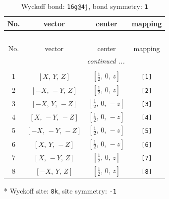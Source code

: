 \documentclass[fleqn,8pt]{jsarticle}
\begin{document}
\begin{longtable}{cccc}
\caption{Wyckoff bond: {\tt 16g@4j}, bond symmetry: {\tt 1}}
 \\
 \hline \hline
No. & vector & center & mapping \\ \hline \endfirsthead

\multicolumn{3}{l}{\tablename\ \thetable{}} \\
 \hline \hline
No. & vector & center & mapping \\ \hline \endhead

 \hline \hline
\multicolumn{3}{r}{\footnotesize\it continued ...} \\ \endfoot

 \hline \hline
\multicolumn{3}{r}{} \\ \endlastfoot

1 & $\left[ X,\, Y,\, Z \right]$ & $\left[ \frac{1}{2},\, 0,\, z \right]$ & {\tt [1]} \\ \hline
2 & $\left[ - X,\, - Y,\, Z \right]$ & $\left[ \frac{1}{2},\, 0,\, z \right]$ & {\tt [2]} \\ \hline
3 & $\left[ - X,\, Y,\, - Z \right]$ & $\left[ \frac{1}{2},\, 0,\, - z \right]$ & {\tt [3]} \\ \hline
4 & $\left[ X,\, - Y,\, - Z \right]$ & $\left[ \frac{1}{2},\, 0,\, - z \right]$ & {\tt [4]} \\ \hline
5 & $\left[ - X,\, - Y,\, - Z \right]$ & $\left[ \frac{1}{2},\, 0,\, - z \right]$ & {\tt [5]} \\ \hline
6 & $\left[ X,\, Y,\, - Z \right]$ & $\left[ \frac{1}{2},\, 0,\, - z \right]$ & {\tt [6]} \\ \hline
7 & $\left[ X,\, - Y,\, Z \right]$ & $\left[ \frac{1}{2},\, 0,\, z \right]$ & {\tt [7]} \\ \hline
8 & $\left[ - X,\, Y,\, Z \right]$ & $\left[ \frac{1}{2},\, 0,\, z \right]$ & {\tt [8]} \\
\end{longtable}
* Wyckoff site: {\tt 8k}, site symmetry: {\tt -1}
\renewcommand{\arraystretch}{1.2}
\end{document}
